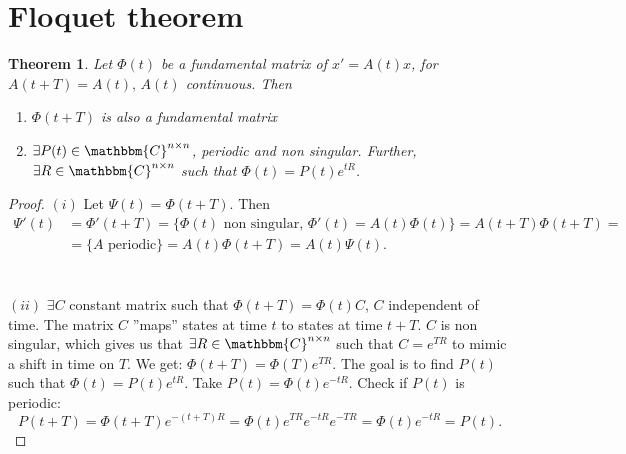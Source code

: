 \documentclass[12pt, a4paper]{article}
\newcommand{\C}{\ensuremath{\mathbbm{C}}}
\newtheorem{theorem}{Theorem}[section]
\begin{document}
\section{Floquet theorem}
\begin{theorem}
Let $\Phi(t)$ be a fundamental matrix of $x' = A(t)x$, for $A(t+T) = A(t),\, A(t)$ continuous. Then
\begin{enumerate}[label=(\roman*)]
\item $\Phi(t+T)$ is also a fundamental matrix
\item $\exists P(t)\in \C^{n\times n}$, periodic and non singular. Further, $\exists R\in\C^{n\times n}$ such that $\Phi(t)=P(t)e^{tR}$.
\end{enumerate}
\end{theorem}
\begin{proof}
$(i)$ Let $\Psi(t) = \Phi(t+T)$. Then
\begin{equation*}
\begin{split}
\Psi'(t) &= \Phi'(t+T) = \{\Phi(t) \text{ non singular, } \Phi'(t) = A(t)\Phi(t) \} = A(t+T)\Phi(t+T) = \\
& = \{ A \text{ periodic}\} = A(t)\Phi(t+T) = A(t)\Psi(t).
\end{split}
\end{equation*}
\\\\
$(ii)$ $\exists C$ constant matrix such that $\Phi(t+T) = \Phi(t)C$, $C$ independent of time. The matrix $C$ ''maps'' states at time $t$ to states at time $t+T$. $C$ is non singular, which gives us that $\exists R\in\C^{n\times n}$ such that $C=e^{TR}$ to mimic a shift in time on $T$. We get: $\Phi(t+T) = \Phi(T)e^{TR}$. The goal is to find $P(t)$ such that $\Phi(t) = P(t)e^{tR}$. Take $P(t) = \Phi(t)e^{-tR}$. Check if $P(t)$ is periodic:
\begin{equation*}
P(t+T) = \Phi(t+T)e^{-(t+T)R} = \Phi(t)e^{TR}e^{-tR}e^{-TR} = \Phi(t)e^{-tR} = P(t).
\end{equation*}
\end{proof}
\end{document}
